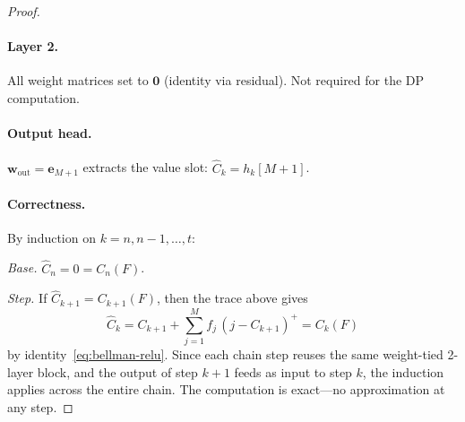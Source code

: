 \documentclass{article}
\begin{document}
\begin{proof}
\paragraph{Layer 2.}
All weight matrices set to $\mathbf{0}$ (identity via residual). Not required for the DP computation.

\paragraph{Output head.}
$\mathbf{w}_{\mathrm{out}} = \mathbf{e}_{M+1}$ extracts the value slot: $\hat C_k = h_k[M{+}1]$.

\paragraph{Correctness.}
By induction on $k = n, n{-}1, \ldots, t$:

\emph{Base.} $\hat C_n = 0 = C_n(F)$.

\emph{Step.} If $\hat C_{k+1} = C_{k+1}(F)$, then the trace above gives
\[
\hat C_k = C_{k+1} + \textstyle\sum_{j=1}^{M} f_j\,(j - C_{k+1})^{+} = C_k(F)
\]
by identity~\eqref{eq:bellman-relu}. Since each chain step reuses the same weight-tied 2-layer block, and the output of step $k{+}1$ feeds as input to step $k$, the induction applies across the entire chain. The computation is exact---no approximation at any step. \qedhere
\end{proof}
\end{document}
